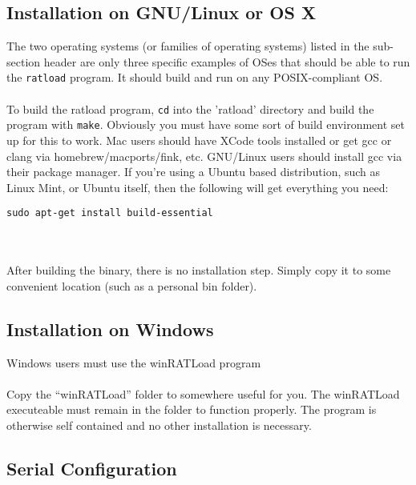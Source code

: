 \documentclass[notitlepage]{article}
\begin{document}
\subsection{Installation on GNU/Linux or OS X}
The two operating systems (or families of operating systems) listed in the sub-section header are only three specific examples of OSes that should be able to run the \texttt{ratload} program. It should build and run on any POSIX-compliant OS.\\\\
To build the ratload program, \texttt{cd} into the 'ratload' directory and build the program with \texttt{make}. Obviously you must have some sort of build environment set up for this to work. Mac users should have XCode tools installed or get gcc or clang via homebrew/macports/fink, etc. GNU/Linux users should install gcc via their package manager. If you're using a Ubuntu based distribution, such as Linux Mint, or Ubuntu itself, then the following will get everything you need:\\
\centerline{\texttt{sudo apt-get install build-essential}}\\\\
After building the binary, there is no installation step. Simply copy it to some convenient location (such as a personal bin folder).

\subsection{Installation on Windows}
Windows users must use the winRATLoad program\\\\
Copy the ``winRATLoad'' folder to somewhere useful for you. The winRATLoad executeable must remain in the folder to function properly. The program is otherwise self contained and no other installation is necessary.


\subsection{Serial Configuration}
\end{document}
